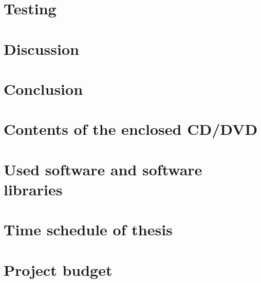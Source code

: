 \documentclass[a4paper,twoside,12pt]{book}
\renewcommand{\chaptermark}[1]{\markboth{#1}{#1}}
\begin{document}
    

\chapter{Testing}

    

\chapter{Discussion}

    
    
    
\chapter{Conclusion} %
%
    
    

\clearpage  %
\printbibliography

\begin{appendices}

    \renewcommand{\chaptermark}[1]{\markboth{#1}{#1}}
    \fancyhead[L]{}


    \chapter{Contents of the enclosed CD/DVD}
    

    \chapter{Used software and software libraries}
    
    
    \chapter{Time schedule of thesis}
    
    
    \chapter{Project budget}
    

\end{appendices}





\newpage %
\appendix %


\end{document}

